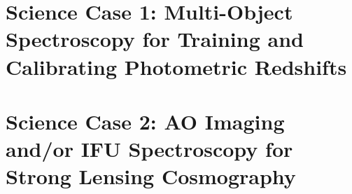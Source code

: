 \documentclass[12pt]{report}
\begin{document}
%
%


\section{Science Case 1: Multi-Object Spectroscopy for Training and Calibrating Photometric Redshifts}




\section{Science Case 2: AO Imaging and/or IFU Spectroscopy for Strong Lensing Cosmography}
\end{document}
